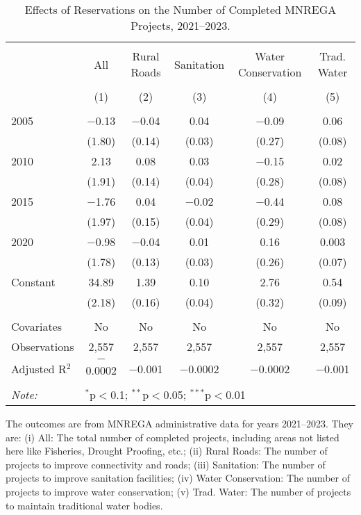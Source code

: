 \begin{table}[!htbp]
\centering
\begin{threeparttable}

  \caption{Effects of Reservations on the Number of Completed MNREGA Projects, 2021--2023.} 
  \label{main_mnrega_2011_2023_additive} 
\scriptsize 
\begin{tabular}{@{\extracolsep{0pt}}lccccc} 
\\[-1.8ex]\hline 
\hline \\[-1.8ex] 
 & All & Rural Roads & Sanitation & Water Conservation & Trad. Water \\ 
\\[-1.8ex] & (1) & (2) & (3) & (4) & (5)\\ 
\hline \\[-1.8ex] 
 2005 & $-$0.13 & $-$0.04 & 0.04 & $-$0.09 & 0.06 \\ 
  & (1.80) & (0.14) & (0.03) & (0.27) & (0.08) \\ 
  2010 & 2.13 & 0.08 & 0.03 & $-$0.15 & 0.02 \\ 
  & (1.91) & (0.14) & (0.04) & (0.28) & (0.08) \\ 
  2015 & $-$1.76 & 0.04 & $-$0.02 & $-$0.44 & 0.08 \\ 
  & (1.97) & (0.15) & (0.04) & (0.29) & (0.08) \\ 
  2020 & $-$0.98 & $-$0.04 & 0.01 & 0.16 & 0.003 \\ 
  & (1.78) & (0.13) & (0.03) & (0.26) & (0.07) \\ 
  Constant & 34.89 & 1.39 & 0.10 & 2.76 & 0.54 \\ 
  & (2.18) & (0.16) & (0.04) & (0.32) & (0.09) \\ 
 \hline \\[-1.8ex] 
Covariates & No & No & No & No & No \\ 
Observations & 2,557 & 2,557 & 2,557 & 2,557 & 2,557 \\ 
Adjusted R$^{2}$ & $-$0.0002 & $-$0.001 & $-$0.0002 & $-$0.0002 & $-$0.001 \\ 
\hline 
\hline \\[-1.8ex] 
\textit{Note:}  & \multicolumn{5}{l}{$^{*}$p$<$0.1; $^{**}$p$<$0.05; $^{***}$p$<$0.01} \\ 
\end{tabular} 
\begin{tablenotes}[flushleft]
\scriptsize
\item The outcomes are from MNREGA administrative data for years 2021--2023. They are: 
(i) All: The total number of completed projects, including areas not listed here like Fisheries, Drought Proofing, etc.;
(ii) Rural Roads: The number of projects to improve connectivity and roads;
(iii) Sanitation: The number of projects to improve sanitation facilities;
(iv) Water Conservation: The number of projects to improve water conservation;
(v) Trad. Water: The number of projects to maintain traditional water bodies.
\end{tablenotes}
\end{threeparttable}
\end{table}

